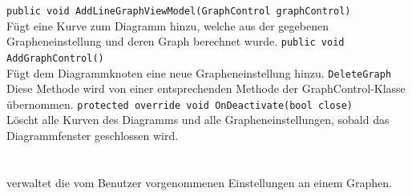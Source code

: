 \begin{itemize}
	\add \verb!public void AddLineGraphViewModel(GraphControl graphControl)! \\
	Fügt eine Kurve zum Diagramm hinzu, welche aus der gegebenen Grapheneinstellung und deren Graph berechnet wurde.
	\add \verb!public void AddGraphControl()! \\
	Fügt dem Diagrammknoten eine neue Grapheneinstellung hinzu.
	\remove \verb!DeleteGraph! \\
	Diese Methode wird von einer entsprechenden Methode der GraphControl-Klasse übernommen.
	\add \verb!protected override void OnDeactivate(bool close)! \\
	Löscht alle Kurven des Diagramms und alle Grapheneinstellungen, sobald das Diagrammfenster geschlossen wird.
\end{itemize}

\paragraph{}~\\
 verwaltet die vom Benutzer vorgenommenen Einstellungen an einem Graphen.
